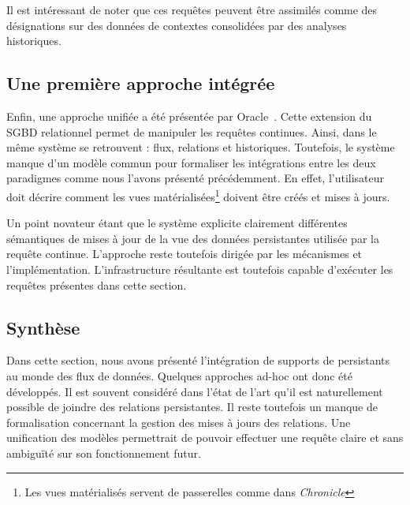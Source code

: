 Il est intéressant de noter que ces requêtes peuvent être assimilés comme des désignations sur des données de contextes consolidées par des analyses historiques.

\subsection{Une première approche intégrée}
Enfin, une approche unifiée a été présentée par Oracle~\cite{Witkowski:oraclecq}. Cette extension du SGBD relationnel permet de manipuler les requêtes continues. Ainsi, dans le même système se retrouvent : flux, relations et historiques. Toutefois, le système manque d'un modèle commun pour formaliser les intégrations entre les deux paradigmes comme nous l'avons présenté précédemment. En effet, l'utilisateur doit décrire comment les vues matérialisées\footnote{Les vues matérialisés servent de passerelles comme dans \textit{Chronicle}} doivent être créés et mises à jours. 

Un point novateur étant que le système explicite clairement différentes sémantiques de mises à jour de la vue des données persistantes utilisée par la requête continue. L'approche reste toutefois dirigée par les mécanismes et l'implémentation. L'infrastructure résultante est toutefois capable d'exécuter les requêtes présentes dans cette section.

\subsection{Synthèse}
Dans cette section, nous avons présenté l'intégration de supports de persistants au monde des flux de données. Quelques approches ad-hoc ont donc été développés. Il est souvent considéré dans l'état de l'art qu'il est naturellement possible de joindre des relations persistantes. Il reste toutefois un manque de formalisation concernant la gestion des mises à jours des relations. Une unification des modèles permettrait de pouvoir effectuer une requête claire et sans ambiguïté sur son fonctionnement futur.
